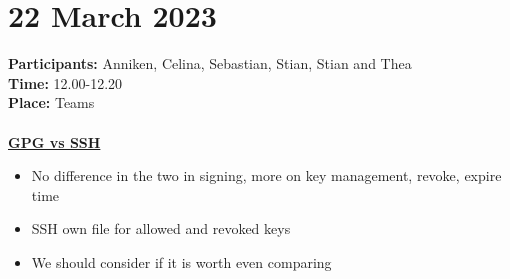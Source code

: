 \section{22 March 2023}
\textbf{Participants:} Anniken, Celina, Sebastian, Stian, Stian and Thea\\
\textbf{Time:} 12.00-12.20 \\
\textbf{Place:} Teams
\\~\\
\textbf{\underline{GPG vs SSH}}
\begin{itemize}
    \item No difference in the two in signing, more on key management, revoke, expire time
    \item SSH own file for allowed and revoked keys
    \item We should consider if it is worth even comparing
\end{itemize}
